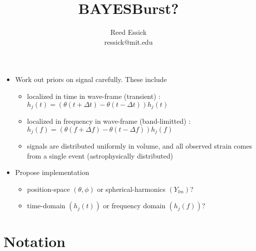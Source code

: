 \documentclass[10pt]{article}
\begin{document}

\title{BAYESBurst?}
\author{Reed Essick\\ressick@mit.edu}
\maketitle


\begin{itemize}
	\item{Work out priors on signal carefully. These include 
		\begin{itemize}
			\item{localized in time in wave-frame (transient) : $h_j(t) = \left(\theta(t+\Delta t) - \theta(t-\Delta t)\right) h_j(t)$}
			\item{localized in frequency in wave-frame (band-limitted) : $h_j(f) = \left(\theta(f+\Delta f) - \theta(t-\Delta f)\right) h_j(f)$}
			\item{signals are distributed uniformly in volume, and all observed strain comes from a single event (astrophysically distributed)}
		\end{itemize}
	     }
	\item{Propose implementation
		\begin{itemize}
			\item{position-space $(\theta, \phi)$ or spherical-harmonics $(Y_{lm})$?}
			\item{time-domain $(h_j(t))$ or frequency domain $(h_j(f))$?}
		\end{itemize}
	     }
\end{itemize}

\tableofcontents
\newpage


\section{Notation}
\end{document}
